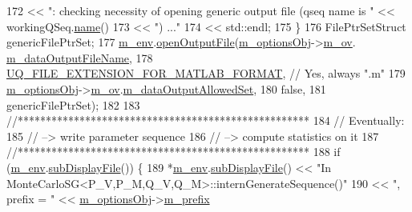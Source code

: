 \begin{DoxyCode}
172                             << \textcolor{stringliteral}{": checking necessity of opening generic output file (qseq name is "} << 
      workingQSeq.\hyperlink{class_q_u_e_s_o_1_1_base_vector_sequence_a48f6fe02cf77f4233d3bcdfef3870f19}{name}()
173                             << \textcolor{stringliteral}{") ..."}
174                             << std::endl;
175   \}
176   FilePtrSetStruct genericFilePtrSet;
177   \hyperlink{class_q_u_e_s_o_1_1_monte_carlo_s_g_a30055a359b22cde54681679aed8ae6e7}{m\_env}.\hyperlink{class_q_u_e_s_o_1_1_base_environment_ab8fe853074f12ea34e18724119a2fc75}{openOutputFile}(\hyperlink{class_q_u_e_s_o_1_1_monte_carlo_s_g_acf7ce935648fd3a5d0ee23685708b4ca}{m\_optionsObj}->\hyperlink{class_q_u_e_s_o_1_1_monte_carlo_s_g_options_a4bc6849a41ede87425cad9ab6e97df11}{m\_ov}.
      \hyperlink{class_q_u_e_s_o_1_1_mc_options_values_a67247424cb0b327fc1b4d6f067ce449c}{m\_dataOutputFileName},
178                        \hyperlink{_defines_8h_ac440026eff7deb1c1eed1eea0e8e36ba}{UQ\_FILE\_EXTENSION\_FOR\_MATLAB\_FORMAT}, \textcolor{comment}{// Yes,
       always ".m"}
179                        \hyperlink{class_q_u_e_s_o_1_1_monte_carlo_s_g_acf7ce935648fd3a5d0ee23685708b4ca}{m\_optionsObj}->\hyperlink{class_q_u_e_s_o_1_1_monte_carlo_s_g_options_a4bc6849a41ede87425cad9ab6e97df11}{m\_ov}.\hyperlink{class_q_u_e_s_o_1_1_mc_options_values_acd7555643c1595e497ccc47bdfae8d55}{m\_dataOutputAllowedSet},
180                        \textcolor{keyword}{false},
181                        genericFilePtrSet);
182 
183   \textcolor{comment}{//****************************************************}
184   \textcolor{comment}{// Eventually:}
185   \textcolor{comment}{// --> write parameter sequence}
186   \textcolor{comment}{// --> compute statistics on it}
187   \textcolor{comment}{//****************************************************}
188   \textcolor{keywordflow}{if} (\hyperlink{class_q_u_e_s_o_1_1_monte_carlo_s_g_a30055a359b22cde54681679aed8ae6e7}{m\_env}.\hyperlink{class_q_u_e_s_o_1_1_base_environment_a8a0064746ae8dddfece4229b9ad374d6}{subDisplayFile}()) \{
189     *\hyperlink{class_q_u_e_s_o_1_1_monte_carlo_s_g_a30055a359b22cde54681679aed8ae6e7}{m\_env}.\hyperlink{class_q_u_e_s_o_1_1_base_environment_a8a0064746ae8dddfece4229b9ad374d6}{subDisplayFile}() << \textcolor{stringliteral}{"In
       MonteCarloSG<P\_V,P\_M,Q\_V,Q\_M>::internGenerateSequence()"}
190                             << \textcolor{stringliteral}{", prefix = "}                                            << 
      \hyperlink{class_q_u_e_s_o_1_1_monte_carlo_s_g_acf7ce935648fd3a5d0ee23685708b4ca}{m\_optionsObj}->\hyperlink{class_q_u_e_s_o_1_1_monte_carlo_s_g_options_ac640fa60af7134d4113e9b7481a34f6c}{m\_prefix}

\end{DoxyCode}
